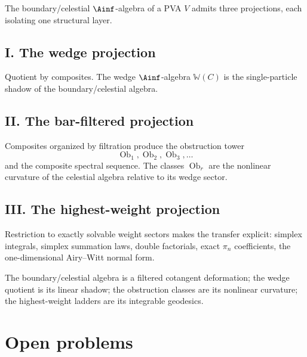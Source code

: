 The boundary/celestial $\Ainf$-algebra of a PVA $V$ admits three projections, each isolating one structural layer.

\subsection*{I. The wedge projection}
Quotient by composites. The wedge $\Ainf$-algebra $\mathbb{W}(C)$ is the single-particle shadow of the boundary/celestial algebra.

\subsection*{II. The bar-filtered projection}
Composites organized by filtration produce the obstruction tower
\[
\operatorname{Ob}_1,\operatorname{Ob}_2,\operatorname{Ob}_3,\dots
\]
and the composite spectral sequence. The classes $\operatorname{Ob}_r$ are the nonlinear curvature of the celestial algebra relative to its wedge sector.

\subsection*{III. The highest-weight projection}
Restriction to exactly solvable weight sectors makes the transfer explicit: simplex integrals, simplex summation laws, double factorials, exact $\pi_n$ coefficients, the one-dimensional Airy--Witt normal form.

The boundary/celestial algebra is a filtered cotangent deformation; the wedge quotient is its linear shadow; the obstruction classes are its nonlinear curvature; the highest-weight ladders are its integrable geodesics.

\section{Open problems}
\label{sec:cbt-open-problems}


